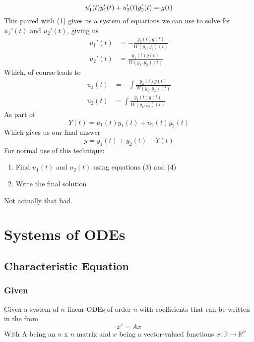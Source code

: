 \documentclass[11pt]{article}
\begin{document}
\begin{equation}
    u_1'(t)y_1'(t) + u_2'(t)y_2'(t) = g(t) \\
\end{equation}
This paired with (1) gives us a system of equations we can use to solve for $u_1'(t)$ and $u_2'(t)$, 
giving us
\begin{align*}
    u_1'(t) &= -\frac{y_2(t)g(t)}{W(y_1, y_2)(t)} \\
    u_2'(t) &= \frac{y_1(t)g(t)}{W(y_1, y_2)(t)}
\end{align*}
Which, of course leads to
\begin{align}
    u_1(t) &= -\int \frac{y_2(t)g(t)}{W(y_1, y_2)(t)} \\
    u_2(t) &= \int \frac{y_1(t)g(t)}{W(y_1, y_2)(t)}
\end{align}
As part of 
\[ Y(t) = u_1(t)y_1(t) + u_2(t)y_2(t) \]
Which gives us our final answer
\[ y = y_1(t) + y_2(t) + Y(t) \]
For normal use of this technique:
\begin{enumerate}
    \item Find $u_1(t)$ and $u_2(t)$ using equations (3) and (4)
    \item Write the final solution
    \end{enumerate}
Not actually that bad.
\section{Systems of ODEs}
\subsection{Characteristic Equation}
\subsubsection{Given}
Given a system of $n$ linear ODEs of order $n$ with coefficients that can be written in the from
\[ x' = Ax \]
With A being an $n$ x $n$ matrix and $x$ being a vector-valued functions $x: \mathbb{R} 
\rightarrow \mathbb{R}^n$
\end{document}
